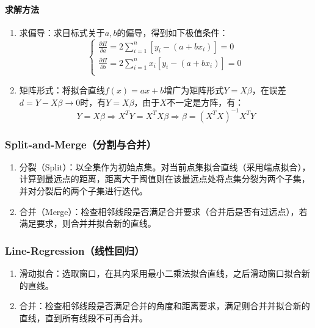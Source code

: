 \documentclass[
12pt, %
a4paper, 
oneside, %
headinclude,footinclude, %
]{scrartcl}
\begin{document}
\paragraph{求解方法}
\begin{enumerate}
\item 求偏导：求目标式关于$ a, b $的偏导，得到如下极值条件：
$$
\begin{cases}
\frac{\partial \Pi}{\partial a} = 2 \sum_{i = 1}^{n} [y_i - (a + bx_i)] = 0 \\
\frac{\partial \Pi}{\partial b} = 2 \sum_{i = 1}^{n} x_i [y_i - (a + bx_i)] = 0 \\
\end{cases}
$$
\item 矩阵形式：将拟合直线$ f(x) = ax + b $增广为矩阵形式$ Y = X\beta $，在误差$ d = Y - X\beta \to 0 $时，有$ Y = X\beta $，由于$ X $不一定是方阵，有：
$$ Y = X\beta \Rightarrow X^T Y = X^T X\beta \Rightarrow \beta = (X^T X)^{-1}X^T Y $$
\end{enumerate}
\subsubsection[Split-and-Merge]{Split-and-Merge（分割与合并）}
\begin{enumerate}
\item 分裂（Split）：以全集作为初始点集。对当前点集拟合直线（采用端点拟合），计算到最远点的距离，距离大于阈值则在该最远点处将点集分裂为两个子集，并对分裂后的两个子集进行迭代。
\item 合并（Merge）：检查相邻线段是否满足合并要求（合并后是否有过远点），若满足要求，则合并并拟合新的直线。
\end{enumerate}
\subsubsection[Line-Regression]{Line-Regression（线性回归）}
\begin{enumerate}
\item 滑动拟合：选取窗口，在其内采用最小二乘法拟合直线，之后滑动窗口拟合新的直线。
\item 合并：检查相邻线段是否满足合并的角度和距离要求，满足则合并并拟合新的直线，直到所有线段不可再合并。
\end{enumerate}
\end{document}
